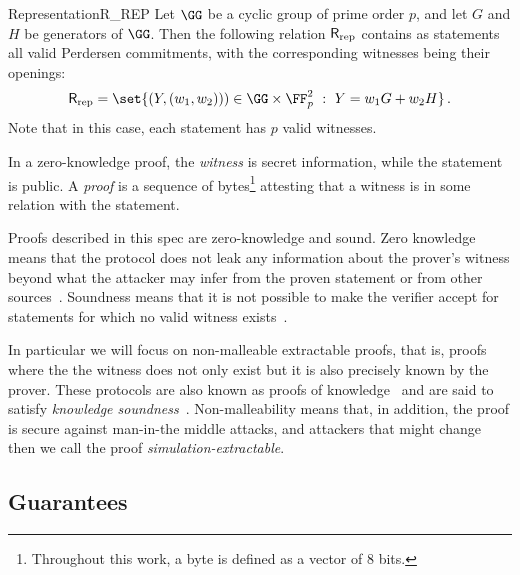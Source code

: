 \documentclass[11pt]{article}
\begin{document}
\begin{example}{Representation}{R_REP}
  Let $\GG$ be a cyclic group of prime order $p$, and let $G$ and $H$ be generators of $\GG$.
	Then the following relation $\mathsf{R}_{\operatorname{rep}}$ contains as statements all valid Perdersen commitments, with the corresponding witnesses being their openings:
  $$
	  \reprelation = \set{\left(\statement,(\witness_1,\witness_2))\right)\in \GG \times \FF_p^2~:~\statement=\witness_1G + \witness_2H}\,.
	$$
	Note that in this case, each statement has $p$ valid witnesses.
\end{example}

In a zero-knowledge proof, the \emph{witness} is secret information, while the statement is public.
A \emph{proof} is a sequence of bytes\footnote{Throughout this work, a byte is defined as a vector of 8 bits.} attesting that a witness is in some relation with the statement.

Proofs described in this spec are zero-knowledge and sound.
Zero knowledge means that the protocol does not leak any information about the prover's witness beyond what the attacker may infer from the proven statement or from other sources~\cite[1.6.4]{zkproof-reference}.
Soundness means that it is not possible to make the verifier accept for statements for which no valid witness exists~\cite[1.6.2]{zkproof-reference}.

In particular we will focus on non-malleable extractable proofs, that is, proofs where the the witness does not only exist but it is also precisely known by the prover.
These protocols are also known as proofs of knowledge~\cite{STOC:GolMicRac85,STOC:FeiFiaSha87,C:BelGol92} and are said to satisfy \emph{knowledge soundness}~\cite{damgard04}. Non-malleability means that, in addition, the proof is secure against man-in-the middle attacks, and attackers that might change  then we call the proof \emph{simulation-extractable}.


\subsection{Guarantees}
\end{document}
